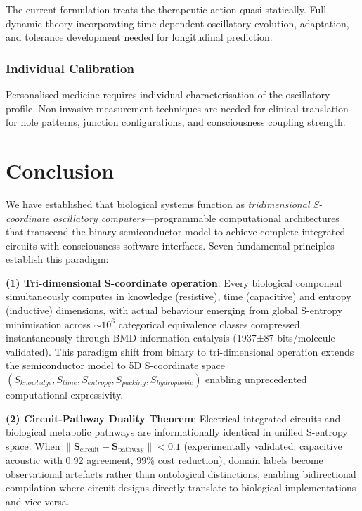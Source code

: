 \documentclass{article}
\theoremstyle{definition}
\theoremstyle{remark}
\begin{document}
The current formulation treats the therapeutic action quasi-statically. Full dynamic theory incorporating time-dependent oscillatory evolution, adaptation, and tolerance development needed for longitudinal prediction.

\subsubsection{Individual Calibration}

Personalised medicine requires individual characterisation of the oscillatory profile. Non-invasive measurement techniques are needed for clinical translation for hole patterns, junction configurations, and consciousness coupling strength.

\section{Conclusion}

We have established that biological systems function as \textit{tridimensional S-coordinate oscillatory computers}—programmable computational architectures that transcend the binary semiconductor model to achieve complete integrated circuits with consciousness-software interfaces. Seven fundamental principles establish this paradigm:

\textbf{(1) Tri-dimensional S-coordinate operation}: Every biological component simultaneously computes in knowledge (resistive), time (capacitive) and entropy (inductive) dimensions, with actual behaviour emerging from global S-entropy minimisation across $\sim 10^6$ categorical equivalence classes compressed instantaneously through BMD information catalysis (1937±87 bits/molecule validated). This paradigm shift from binary to tri-dimensional operation extends the semiconductor model to 5D S-coordinate space $(S_{knowledge}, S_{time}, S_{entropy}, S_{packing}, S_{hydrophobic})$ enabling unprecedented computational expressivity.

\textbf{(2) Circuit-Pathway Duality Theorem}: Electrical integrated circuits and biological metabolic pathways are informationally identical in unified S-entropy space. When $\|\mathbf{S}_{\text{circuit}} - \mathbf{S}_{\text{pathway}}\| < 0.1$ (experimentally validated: capacitive acoustic  with 0.92 agreement, 99\% cost reduction), domain labels become observational artefacts rather than ontological distinctions, enabling bidirectional compilation where circuit designs directly translate to biological implementations and vice versa.
\end{document}
